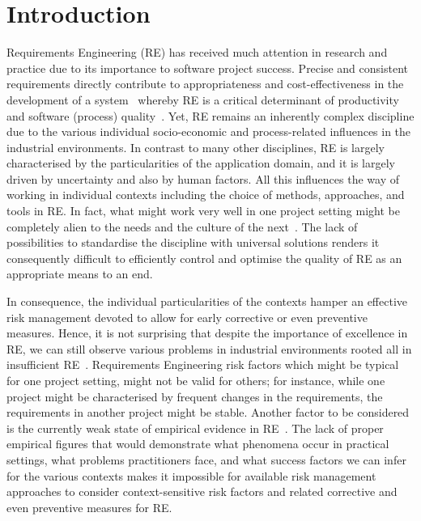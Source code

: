 \documentclass[lnbip]{svmultln}
\begin{document}
\section{Introduction}

Requirements Engineering (RE) has received much attention in research and practice due to its importance to software project success. Precise and consistent requirements directly contribute to appropriateness and cost-effectiveness in the development of a system~\cite{NE00} whereby RE is a critical determinant of productivity and software (process) quality~\cite{DC06}. Yet, RE remains an inherently complex discipline due to the various individual socio-economic and process-related influences in the industrial environments. In contrast to many other disciplines, RE is largely characterised by the particularities of the application domain, and it is largely driven by uncertainty and also by human factors. All this influences the way of working in individual contexts including the choice of methods, approaches, and tools in RE. In fact, what might work very well in one project setting might be completely alien to the needs and the culture of the next~\cite{MW2013}. The lack of possibilities to standardise the discipline with universal solutions renders it consequently difficult to efficiently control and optimise the quality of RE as an appropriate means to an end. 

In consequence, the individual particularities of the contexts hamper an effective risk management devoted to allow for early corrective or even preventive measures. Hence, it is not surprising that despite the importance of excellence in RE, we can still observe various problems in industrial environments rooted all in insufficient RE~\cite{fernandez2015naming, MW+16}. Requirements Engineering risk factors which might be typical for one project setting, might not be valid for others; for instance, while one project might be characterised by frequent changes in the requirements, the requirements in another project might be stable. Another factor to be considered is the currently weak state of empirical evidence in RE~\cite{fernandez2015naming, MW+16}. The lack of proper empirical figures that would demonstrate what phenomena occur in practical settings, what problems practitioners face, and what success factors we can infer for the various contexts makes it impossible for available risk management approaches to consider context-sensitive risk factors and related corrective and even preventive measures for RE.
\end{document}
